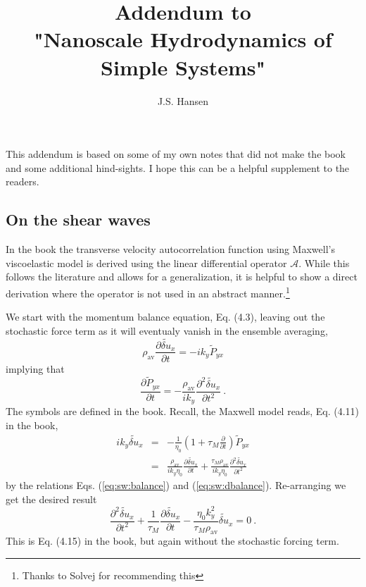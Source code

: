 \documentclass[11pt]{article}
\date{}
\author{J.S. Hansen}
\title{Addendum to \\ "Nanoscale Hydrodynamics of Simple Systems"}
\begin{document}
\maketitle

\noindent This addendum is based on some of my own notes that did not make the book and some 
additional hind-sights. I hope this can be a helpful supplement to the readers.



\subsection*{On the shear waves}
In the book the transverse velocity autocorrelation function using Maxwell's viscoelastic model is 
derived using the linear differential operator $\mathcal{A}$. While this follows the literature and
allows for a generalization, it is helpful to show a direct derivation where 
the operator is not used in an abstract manner.\footnote{Thanks to Solvej for recommending this}  

We start with the momentum balance equation, Eq. (4.3), leaving out the stochastic force term as it will eventualy vanish in the ensemble 
averaging, 
\begin{equation}
	\label{eq:sw:balance}
	\rho_\text{av} \frac{\partial \widetilde{\delta u}_x}{\partial t} = -ik_y \widetilde{P}_{yx}
\end{equation}
implying that
\begin{equation}
	\label{eq:sw:dbalance}
	\frac{\partial \widetilde{P}_{yx}}{\partial t} = - \frac{\rho_\text{av}}{i k_y}\frac{\partial^2 \widetilde{\delta u}_x}{\partial t^2} \ .
\end{equation}
The symbols are defined in the book. Recall, the Maxwell model reads, Eq. (4.11) in the book,
\begin{eqnarray}
	ik_y \widetilde{\delta u}_x &=& - \frac{1}{\eta_0} \left(1 + \tau_M \frac{\partial}{\partial t}\right) \widetilde{P}_{yx} \\
	&=& \frac{\rho_\text{av}}{i k_y\eta_0} \frac{\partial \widetilde{\delta u}_x}{\partial t} 
	+ \frac{\tau_M \rho_\text{av}}{ik_y\eta_0}\frac{\partial^2\widetilde{\delta u}_x}{\partial t^2} 
\end{eqnarray}
by the relations Eqs. (\ref{eq:sw:balance}) and (\ref{eq:sw:dbalance}). Re-arranging we get the desired 
result
\begin{equation}
	\frac{\partial^2\widetilde{\delta u}_x}{\partial t^2} + \frac{1}{\tau_M} \frac{\partial \widetilde{\delta u}_x}{\partial t} - 
	\frac{\eta_0 k_y^2}{\tau_M \rho_\text{av}} \widetilde{\delta u}_x = 0 \ .
\end{equation}
This is Eq. (4.15) in the book, but again without the stochastic forcing term.
\end{document}

